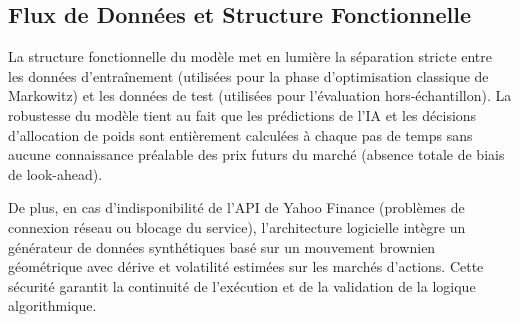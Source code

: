 \subsection{Flux de Données et Structure Fonctionnelle}
La structure fonctionnelle du modèle met en lumière la séparation stricte entre les données d'entraînement (utilisées pour la phase d'optimisation classique de Markowitz) et les données de test (utilisées pour l'évaluation hors-échantillon). La robustesse du modèle tient au fait que les prédictions de l'IA et les décisions d'allocation de poids sont entièrement calculées à chaque pas de temps sans aucune connaissance préalable des prix futurs du marché (absence totale de biais de look-ahead).

De plus, en cas d'indisponibilité de l'API de Yahoo Finance (problèmes de connexion réseau ou blocage du service), l'architecture logicielle intègre un générateur de données synthétiques basé sur un mouvement brownien géométrique avec dérive et volatilité estimées sur les marchés d'actions. Cette sécurité garantit la continuité de l'exécution et de la validation de la logique algorithmique.


